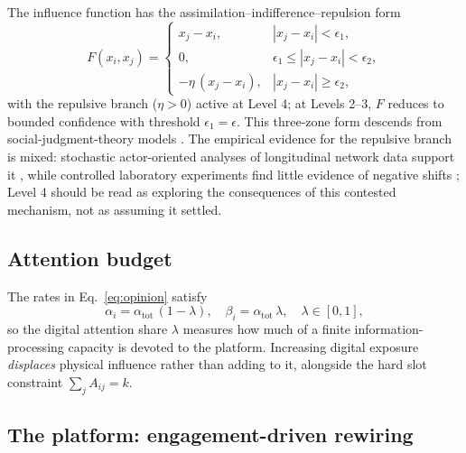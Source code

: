 \documentclass[5p,times,twocolumn]{elsarticle}
\begin{document}
The influence function has the assimilation--indifference--repulsion form
\begin{equation}
  F(x_i, x_j) =
  \begin{cases}
    x_j - x_i, & |x_j - x_i| < \epsilon_1, \\
    0, & \epsilon_1 \le |x_j - x_i| < \epsilon_2, \\
    -\eta\,(x_j - x_i), & |x_j - x_i| \ge \epsilon_2,
  \end{cases}
  \label{eq:influence}
\end{equation}
with the repulsive branch ($\eta > 0$) active at Level 4; at Levels
2--3, $F$ reduces to bounded confidence with threshold
$\epsilon_1 = \epsilon$. This three-zone form descends from
social-judgment-theory models \citep{jager2005, kurmyshev2011}. The
empirical evidence for the repulsive branch is mixed: stochastic
actor-oriented analyses of longitudinal network data support it
\citep{tang2025}, while controlled laboratory experiments find little
evidence of negative shifts \citep{takacs2016}; Level 4 should be read as
exploring the consequences of this contested mechanism, not as assuming it
settled.

\subsection{Attention budget}

The rates in Eq.~\eqref{eq:opinion} satisfy
\begin{equation}
  \alpha_i = \alpha_{\mathrm{tot}}\,(1 - \lambda),
  \quad
  \beta_i = \alpha_{\mathrm{tot}}\,\lambda,
  \quad \lambda \in [0,1],
  \label{eq:attention}
\end{equation}
so the digital attention share $\lambda$ measures how much of a finite
information-processing capacity is devoted to the platform. Increasing
digital exposure \emph{displaces} physical influence rather than adding to
it, alongside the hard slot constraint $\sum_j A_{ij} = k$.

\subsection{The platform: engagement-driven rewiring}
\end{document}
